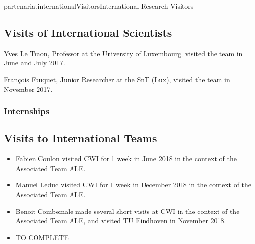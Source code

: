 \documentclass{ra2018}
\begin{document}
\begin{module}{partenariat}{internationalVisitors}{International Research Visitors}

\subsection{Visits of International Scientists}

Yves Le Traon, Professor at the University of Luxembourg, visited the team in June and July 2017.

François Fouquet, Junior Researcher at the SnT (Lux), visited the team in November 2017.

   \subsubsection{Internships}




\subsection{Visits to International Teams}


\begin{itemize}
\item Fabien Coulon visited CWI for 1 week in June 2018 in the context of the Associated Team ALE. 
\item Manuel Leduc visited CWI for 1 week in December 2018 in the context of the Associated Team ALE. 
\item Benoit Combemale made several short visits at CWI in the context of the Associated Team ALE, and visited TU Eindhoven in November 2018. 
\item TO COMPLETE
\end{itemize}


\end{module}
\end{document}
